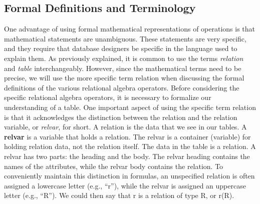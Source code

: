 \documentclass[a4paper, 12pt, titlepage]{report}
\begin{document}
\subsection{Formal Definitions and Terminology}
One advantage of using formal mathematical representations of operations is that mathematical statements are unambiguous. These statements are very specific, and they require that database designers be specific in the language used to explain them. As previously explained, it is common to use the terms \emph{relation} and \emph{table} interchangeably. However, since the mathematical terms need to be precise, we will use the more specific term relation when discussing the formal definitions of the various relational algebra operators. Before considering the specific relational algebra operators, it is necessary to formalize our understanding of a table. One important aspect of using the specific term relation is that it acknowledges the distinction between the relation and the relation variable, or \emph{relvar}, for short. A relation is the data that we see in our tables. A { \textbf{relvar} is a variable that holds a relation. The relvar is a container (variable) for holding relation data, not the relation itself. The data in the table is a relation. A relvar has two parts: the heading and the body. The relvar heading contains the names of the attributes, while the relvar body contains the relation. To conveniently maintain this distinction in formulas, an unspecified relation is often assigned a lowercase letter (e.g., “r”), while the relvar is assigned an uppercase letter (e.g., “R”). We could then say that r is a relation of type R, or r(R).
}
\end{document}

